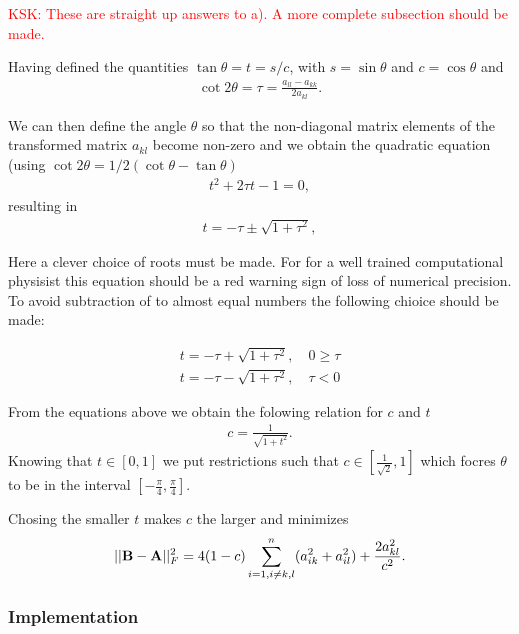 \documentclass[11pt,a4paper,english,draft]{article}
\numberwithin{equation}{section}
\begin{document}
\textcolor{red}{KSK: These are straight up answers to a). A more complete subsection should be made.}

Having defined the quantities $\tan\theta = t= s/c$, with $s=\sin\theta$ and $c=\cos\theta$ and
\begin{gather}\cot 2\theta=\tau = \frac{a_{ll}-a_{kk}}{2a_{kl}}.
\end{gather}

We can then define the angle $\theta$ so that the non-diagonal matrix elements of the transformed matrix 
$a_{kl}$ become non-zero and
we obtain the quadratic equation (using $\cot 2\theta=1/2(\cot \theta-\tan\theta)$
\begin{gather}
t^2+2\tau t-1= 0,
\end{gather}
resulting in 
\begin{gather}
  t = -\tau \pm \sqrt{1+\tau^2},
\end{gather}

Here a clever choice of roots must be made. For for a well trained computational physisist this equation should be a red warning sign of loss of numerical precision. To avoid subtraction of to almost equal numbers the following chioice should be made:

\begin{align*}
t=  -\tau + \sqrt{1+\tau^2}, \quad   0  \geq \tau \\
t=  -\tau - \sqrt{1+\tau^2}, \quad   \tau <  0
\end{align*}

From the equations above we obtain the folowing relation for $c$ and $t$
\begin{gather}
   c = \frac{1}{\sqrt{1+t^2}}.
\end{gather}
Knowing that $t \in [0,1]$ we put restrictions such that $c \in [\frac{1}{\sqrt{2}}, 1]$ which focres $\theta$ to be in the interval $[- \frac{\pi}{4},\frac{\pi}{4}]$.  

Chosing the smaller $t$ makes $c$ the larger and minimizes 
\begin{gather}
||{\bf B}-{\bf A}||_F^2=4(1-c)\sum_{i=1,i\ne k,l}^n(a_{ik}^2+a_{il}^2) +\frac{2a_{kl}^2}{c^2}.
\end{gather}


\subsubsection{Implementation}
\end{document}

